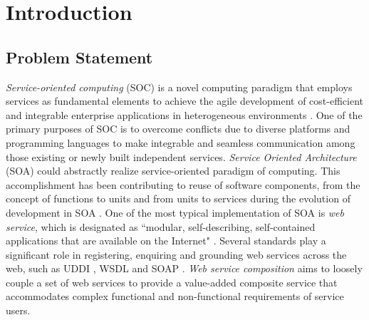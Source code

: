 \chapter{Introduction}\label{C:intro}

\section{Problem Statement}
\emph{Service-oriented computing} (SOC) is a novel computing paradigm that employs services as fundamental elements to achieve the agile development of cost-efficient and integrable enterprise applications in heterogeneous environments \cite{papazoglou2003service, papazoglou2006p}. One of the primary purposes of SOC is to overcome conflicts due to diverse platforms and programming languages to make integrable and seamless communication among those existing or newly built independent services. \emph{Service Oriented Architecture} (SOA)  could abstractly realize service-oriented paradigm of computing. This accomplishment has been contributing to reuse of software components, from the concept of functions to units and from units to services during the evolution of development in SOA \cite{booth2004web, overdick2007resource}. One of the most typical implementation of SOA is \emph{web service}, which is designated as ``modular, self-describing, self-contained applications that are available on the Internet" \cite{curbera2001web}. Several standards play a significant role in registering, enquiring and grounding web services across the web, such as UDDI \cite{curbera2002unraveling}, WSDL \cite{lausen2007semantic} and SOAP \cite{fensel2011semantic}. \emph{Web service composition} aims to loosely couple a set of web services to provide a value-added composite service that accommodates complex functional and non-functional requirements of service users. 

